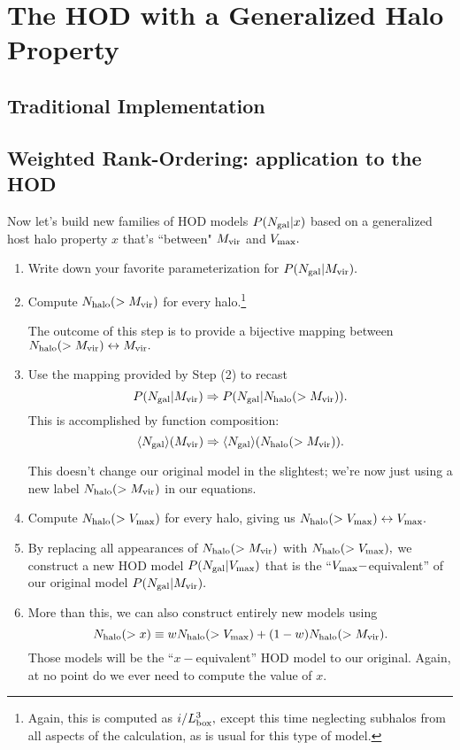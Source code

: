 \documentclass[usenatbib,usegraphicx,letterpaper]{mn2e}
\newcommand{\Ngal}{N_{\rm gal}}
\newcommand{\Nhalo}{N_{\rm halo}}
\newcommand{\vmax}{V_{\rm max}}
\newcommand{\mvir}{M_{\rm vir}}
\newcommand{\mpeak}{M_{\rm peak}}
\newcommand{\vpeak}{V_{\rm peak}}
\newcommand{\ben}{\begin{enumerate}}
\newcommand{\een}{\end{enumerate}}
\begin{document}

\section{The HOD with a Generalized Halo Property}
\label{sec:hodclf}

\subsection{Traditional Implementation}
\label{subsec:tradhodclf}

\subsection{Weighted Rank-Ordering: application to the HOD}
\label{subsec:genhodclf}

Now let's build new families of HOD models $P(\Ngal|x)$ based on a generalized host halo property $x$ that's ``between" $\mvir$ and $\vmax.$ 

\ben
\item Write down your favorite parameterization for $P(\Ngal | \mvir).$
\item Compute $\Nhalo(>\mvir)$ for every halo.\footnote{Again, this is computed as $i/L_{\rm box}^{3},$ except this time neglecting subhalos from all aspects of the calculation, as is usual for this type of model.} 

The outcome of this step is to provide a bijective mapping between $\Nhalo(>\mvir)\leftrightarrow\mvir.$ 
\item Use the mapping provided by Step (2) to recast $$P(\Ngal | \mvir)\Rightarrow P(\Ngal |\Nhalo(>\mvir)).$$
This is accomplished by function composition: $$\langle\Ngal\rangle(\mvir)\Rightarrow\langle\Ngal\rangle(\Nhalo(>\mvir)).$$

This doesn't change our original model in the slightest; we're now just using a new label $\Nhalo(>\mvir)$ in our equations.
\item Compute $\Nhalo(>\vmax)$ for every halo, giving us $\Nhalo(>\vmax)\leftrightarrow\vmax.$ 
\item By replacing all appearances of $\Nhalo(>\mvir)$ with $\Nhalo(>\vmax),$ 
we construct a new HOD model $P(\Ngal|\vmax)$ that is the ``$\vmax-$equivalent'' of our original model $P(\Ngal | \mvir).$
\item More than this, we can also construct entirely new models using $$\Nhalo(>x) \equiv w\Nhalo(>\vmax) + (1-w)\Nhalo(>\mvir).$$ 
Those models will be the ``$x-$equivalent'' HOD model to our original. Again, at no point do we ever need to compute the value of $x.$
\een
\end{document}
